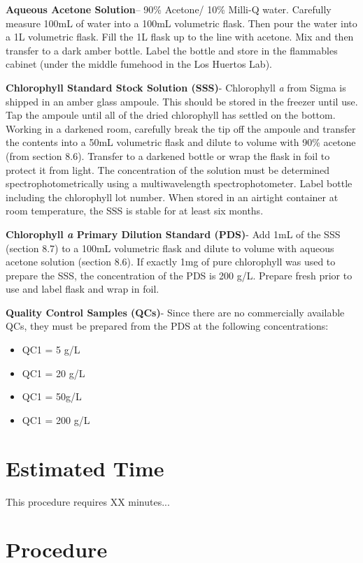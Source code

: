 \documentclass[12pt]{../SOP3_alpha}
\begin{document}
\NP \textbf{Aqueous Acetone Solution}-- 90\% Acetone/ 10\% Milli-Q water. Carefully measure 100mL of water into a 100mL volumetric flask. Then pour the water into a 1L volumetric flask. Fill the 1L flask up to the line with acetone. Mix and then transfer to a dark amber bottle. Label the bottle and store in the flammables cabinet (under the middle fumehood in the Los Huertos Lab). 

\NP \textbf{Chlorophyll Standard Stock Solution (SSS)}- Chlorophyll \textit{a} from Sigma is shipped in an amber glass ampoule. This should be stored in the freezer until use. Tap the ampoule until all of the dried chlorophyll has settled on the bottom. Working in a darkened room, carefully break the tip off the ampoule and transfer the contents into a 50mL volumetric flask and dilute to volume with 90\% acetone (from section 8.6). Transfer to a darkened bottle or wrap the flask in foil to protect it from light. The concentration of the solution must be determined spectrophotometrically using a multiwavelength spectrophotometer. Label bottle including the chlorophyll lot number. When stored in an airtight container at room temperature, the SSS is stable for at least six months.

\NP \textbf{Chlorophyll \textit{a} Primary Dilution Standard (PDS)}- Add 1mL of the SSS (section 8.7) to a 100mL volumetric flask and dilute to volume with aqueous acetone solution (section 8.6). If exactly 1mg of pure chlorophyll was used to prepare the SSS, the concentration of the PDS is 200 \micro g/L. Prepare fresh prior to use and label flask and wrap in foil.

\NP \textbf{Quality Control Samples (QCs)}- Since there are no commercially available QCs, they must be prepared from the PDS at the following concentrations:
\begin{itemize}
\item QC1 = 5 \micro g/L
\item QC1 = 20 \micro g/L
\item QC1 = 50\micro g/L
\item QC1 = 200 \micro g/L
\end{itemize}

\section{Estimated Time}

\NP This procedure requires XX minutes...

\section{Procedure} 
\end{document}
